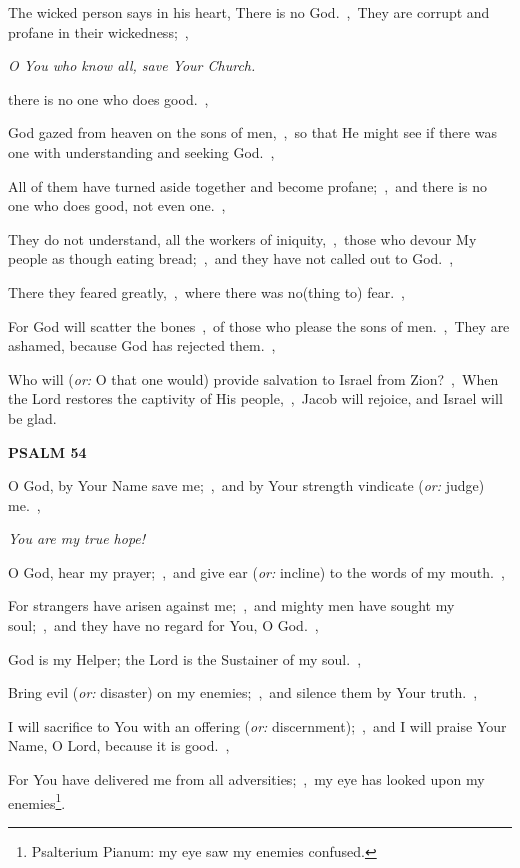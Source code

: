 \documentclass[12pt,twoside,a5paper]{article}
\newcommand{\psalm}[1]{\textbf{PSALM {#1}}\nopagebreak}
\newcommand{\qanona}[1]{{\liturgicalhint{Qanona.} \emph{#1}}}
\newcommand{\translationoption}[1]{\emph{or:} #1}
\begin{document}
\begin{normalparskip}
  The wicked person says in his heart, There is no God.~\sep\ They are corrupt and profane in their wickedness;~\sep

  \qanona{O You who know all, save Your Church.}

  there is no one who does good.~\sep

  God gazed from heaven on the sons of men,~\sep\ so that He might see if there was one with understanding and seeking God.~\sep

  All of them have turned aside together and become profane;~\sep\ and there is no one who does good, not even one.~\sep

  They do not understand, all the workers of iniquity,~\sep\ those who devour My people as though eating bread;~\sep\ and they have not called out to God.~\sep

  There they feared greatly,~\sep\ where there was no(thing to) fear.~\sep

  For God will scatter the bones~\sep\ of those who please the sons of men.~\sep\ They are ashamed, because God has rejected them.~\sep

  Who will (\translationoption{O that one would}) provide salvation to Israel from Zion?~\sep\ When the Lord restores the captivity of His people,~\sep\ Jacob will rejoice, and Israel will be glad.
\end{normalparskip}

\psalm{54}

\begin{normalparskip}
  O God, by Your Name save me;~\sep\ and by Your strength vindicate (\translationoption{judge}) me.~\sep

  \qanona{You are my true hope!}

  O God, hear my prayer;~\sep\ and give ear (\translationoption{incline}) to the words of my mouth.~\sep

  For strangers have arisen against me;~\sep\ and mighty men have sought my soul;~\sep\ and they have no regard for You, O God.~\sep

  God is my Helper; the Lord is the Sustainer of my soul.~\sep

  Bring evil (\translationoption{disaster}) on my enemies;~\sep\ and silence them by Your truth.~\sep

  I will sacrifice to You with an offering (\translationoption{discernment});~\sep\ and I will praise Your Name, O Lord, because it is good.~\sep

  For You have delivered me from all adversities;~\sep\ my eye has looked upon my enemies\footnote{Psalterium Pianum: my eye saw my enemies confused.}.
\end{normalparskip}
\end{document}
